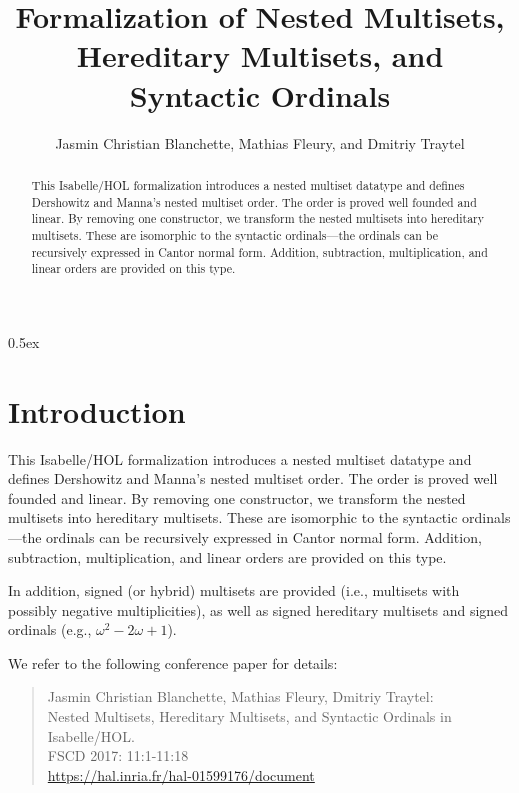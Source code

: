 \documentclass[10pt,a4paper]{article}
\begin{document}
\title{Formalization of Nested Multisets, Hereditary Multisets, and Syntactic Ordinals}
\author{Jasmin Christian Blanchette, Mathias Fleury, and Dmitriy Traytel}

\maketitle

\begin{abstract}
\noindent
This Isabelle/HOL formalization introduces a nested multiset datatype and
defines Dershowitz and Manna's nested multiset order. The order is proved well
founded and linear. By removing one constructor, we transform the nested
multisets into hereditary multisets. These are isomorphic to the syntactic
ordinals---the ordinals can be recursively expressed in Cantor normal form.
Addition, subtraction, multiplication, and linear orders are provided on this
type.
\end{abstract}

\tableofcontents

\parindent 0pt
\parskip 0.5ex

\section{Introduction}

This Isabelle/HOL formalization introduces a nested multiset datatype and
defines Dershowitz and Manna's nested multiset order. The order is proved well
founded and linear. By removing one constructor, we transform the nested
multisets into hereditary multisets. These are isomorphic to the syntactic
ordinals---the ordinals can be recursively expressed in Cantor normal form.
Addition, subtraction, multiplication, and linear orders are provided on this
type.

In addition, signed (or hybrid) multisets are provided (i.e., multisets with
possibly negative multiplicities), as well as signed hereditary multisets
and signed ordinals (e.g., $\omega^2 - 2\omega + 1$).

We refer to the following conference paper for details:

\begin{quote}
Jasmin Christian Blanchette, Mathias Fleury, Dmitriy Traytel: \\
Nested Multisets, Hereditary Multisets, and Syntactic Ordinals in Isabelle/HOL. \\
FSCD 2017: 11:1-11:18 \\
\url{https://hal.inria.fr/hal-01599176/document}
\end{quote}



%
%

%
%
\end{document}
